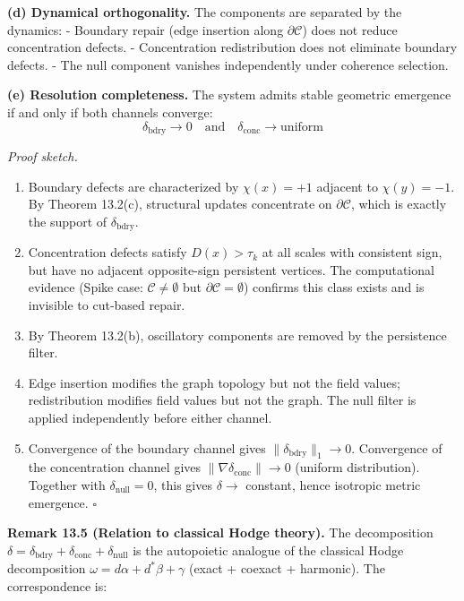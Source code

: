 \documentclass[
]{article}
\begin{document}
\textbf{(d) Dynamical orthogonality.} The components are separated by
the dynamics: - Boundary repair (edge insertion along
\(\partial\mathcal{C}\)) does not reduce concentration defects. -
Concentration redistribution does not eliminate boundary defects. - The
null component vanishes independently under coherence selection.

\textbf{(e) Resolution completeness.} The system admits stable geometric
emergence if and only if both channels converge:
\[\delta_{\mathrm{bdry}} \to 0 \quad \text{and} \quad \delta_{\mathrm{conc}} \to \text{uniform}\]

\emph{Proof sketch.}

\begin{enumerate}
\def\labelenumi{(\alph{enumi})}
\item
  Boundary defects are characterized by \(\chi(x) = +1\) adjacent to
  \(\chi(y) = -1\). By Theorem 13.2(c), structural updates concentrate
  on \(\partial\mathcal{C}\), which is exactly the support of
  \(\delta_{\mathrm{bdry}}\).
\item
  Concentration defects satisfy \(D(x) > \tau_k\) at all scales with
  consistent sign, but have no adjacent opposite-sign persistent
  vertices. The computational evidence (Spike case:
  \(\mathcal{C} \neq \emptyset\) but
  \(\partial\mathcal{C} = \emptyset\)) confirms this class exists and is
  invisible to cut-based repair.
\item
  By Theorem 13.2(b), oscillatory components are removed by the
  persistence filter.
\item
  Edge insertion modifies the graph topology but not the field values;
  redistribution modifies field values but not the graph. The null
  filter is applied independently before either channel.
\item
  Convergence of the boundary channel gives
  \(\|\delta_{\mathrm{bdry}}\|_1 \to 0\). Convergence of the
  concentration channel gives
  \(\|\nabla \delta_{\mathrm{conc}}\| \to 0\) (uniform distribution).
  Together with \(\delta_{\mathrm{null}} = 0\), this gives
  \(\delta \to\) constant, hence isotropic metric emergence. \(\square\)
\end{enumerate}

\textbf{Remark 13.5 (Relation to classical Hodge theory).} The
decomposition
\(\delta = \delta_{\mathrm{bdry}} + \delta_{\mathrm{conc}} + \delta_{\mathrm{null}}\)
is the autopoietic analogue of the classical Hodge decomposition
\(\omega = d\alpha + d^*\beta + \gamma\) (exact + coexact + harmonic).
The correspondence is:
\end{document}
